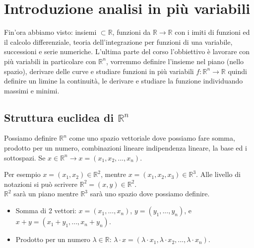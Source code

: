 \newpage
\section{Introduzione analisi in più variabili}
Fin'ora abbiamo visto: insiemi $\subset \mathbb{R}$, funzioni da $\mathbb{R}\to \mathbb{R}$ con i imiti di funzioni ed il calcolo differenziale, teoria dell'integrazione per funzioni di una variabile, successioni e serie numeriche. L'ultima parte del corso l'obbiettivo è lavorare con più variabili in particolare con $\mathbb{R}^n$, vorremmo definire l'insieme nel piano (nello spazio), derivare delle curve e studiare funzioni in più variabili $f: \mathbb{R}^n \to \mathbb{R}$ quindi definire un limine la continuità, le derivare e studiare la funzione individuando massimi e minimi.
\subsection{Struttura euclidea di $\mathbb{R}^n$}
\begin{definition}
Possiamo definire $\mathbb{R}^n$ come uno spazio vettoriale dove possiamo fare somma, prodotto per un numero, combinazioni lineare indipendenza lineare, la base ed i sottospazi. Se $x \in \mathbb{R}^n \rightarrow x = (x_1, x_2, ..., x_n)$.
\end{definition}
\hspace{-15pt}Per esempio $x = (x_1, x_2)\in \mathbb{R}^2$, mentre $x = (x_1, x_2, x_3) \in \mathbb{R}^3$. Alle livello di notazioni si può scrivere $\mathbb{R}^2 = (x,y) \in \mathbb{R}^2$. \\
$\mathbb{R}^2$ sarà un piano mentre $\mathbb{R}^3$ sarà uno spazio dove possiamo definire.
\begin{itemize}
    \item Somma di 2 vettori: $x = (x_1, ..., x_n)$, $y = (y_1, ..., y_n)$, e $x + y = (x_1 + y_1, ..., x_n + y_n)$.
    \item Prodotto per un numero $\lambda \in \mathbb{R}$: $\lambda \cdot x = (\lambda \cdot x_1, \lambda \cdot x_2, ..., \lambda\cdot x_n)$.
\end{itemize}

